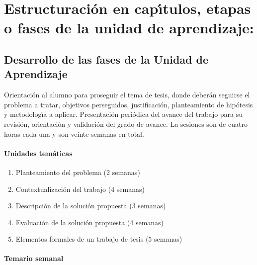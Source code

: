 \section{Estructuraci\'{o}n en cap\'{\i}tulos, etapas o fases de la unidad de
  aprendizaje:}

\subsection{Desarrollo de las fases de la Unidad de Aprendizaje}

\quad

Orientaci\'{o}n al alumno para proseguir el tema de tesis, donde
deber\'{a}n seguirse el problema a tratar, objetivos perseguidos,
justificaci\'{o}n, planteamiento de hip\'{o}tesis y metodolog\'{\i}a a
aplicar.  Presentaci\'{o}n peri\'{o}dica del avance del trabajo para
su revisi\'{o}n, orientaci\'{o}n y validaci\'{o}n del grado de
avance. La sesiones son de cuatro horas cada una y son veinte semanas
en total.

\paragraph{Unidades tem\'{a}ticas}

\quad

\begin{enumerate}[itemsep=-2pt]
\item Planteamiento del problema (2 semanas)
\item Contextualizaci\'{o}n del trabajo (4 semanas)
\item Descripci\'{o}n de la soluci\'{o}n propuesta (3 semanas)
\item Evaluaci\'{o}n de la soluci\'{o}n propuesta (4 semanas)
\item Elementos formales de un trabajo de tesis (5 semanas)
\end{enumerate}

\paragraph{Temario semanal}

\quad
